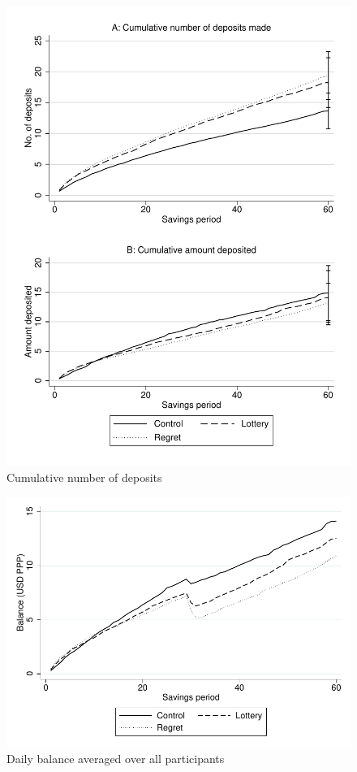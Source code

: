 \documentclass[11pt]{article}
\begin{document}
		\begin{figure}[ht]
		\centering
		\caption{Cumulative number of deposits}
		\includegraphics[width=\textwidth]{../../figures/line-cumdeposits.pdf}
		\end{figure}

		\begin{figure}[ht]
		\centering
		\caption{Daily balance averaged over all participants}
		\includegraphics[width=\textwidth]{../../figures/line-balance.pdf}
		\end{figure}
\end{document}
